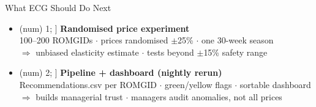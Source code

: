 \documentclass[aspectratio=169]{beamer}
\newcommand{\circlenum}[2]{%
  \tikz[baseline=(num.base)]{%
    \node[circle,fill=#1,text=white,inner sep=1pt,
          minimum size=14pt,font=\footnotesize\bfseries] (num) {#2};%
  }%
}
\begin{document}
\begin{frame}{What ECG Should Do Next}
\vspace{1em}

\begin{itemize}\setlength\itemsep{18pt}

  \item[\circlenum{accentorange}{1}]
        {\normalsize\bfseries\color{accentorange} Randomised price experiment}\\[3pt]
        {\small\color{darktext} 100--200 ROMGIDs $\cdot$ prices randomised $\pm$25\% $\cdot$ one 30-week season}\\[2pt]
        {\small\color{lightgray} $\Rightarrow$ unbiased elasticity estimate $\cdot$ tests beyond $\pm$15\% safety range}

  \item[\circlenum{beamerblue}{2}]
        {\normalsize\bfseries\color{beamerblue} Pipeline + dashboard (nightly rerun)}\\[3pt]
        {\small\color{darktext} Recommendations.csv per ROMGID $\cdot$ green/yellow flags $\cdot$ sortable dashboard}\\[2pt]
        {\small\color{lightgray} $\Rightarrow$ builds managerial trust $\cdot$ managers audit anomalies, not all prices}

\end{itemize}

\vspace{0.5em}
\end{frame}
\end{document}
